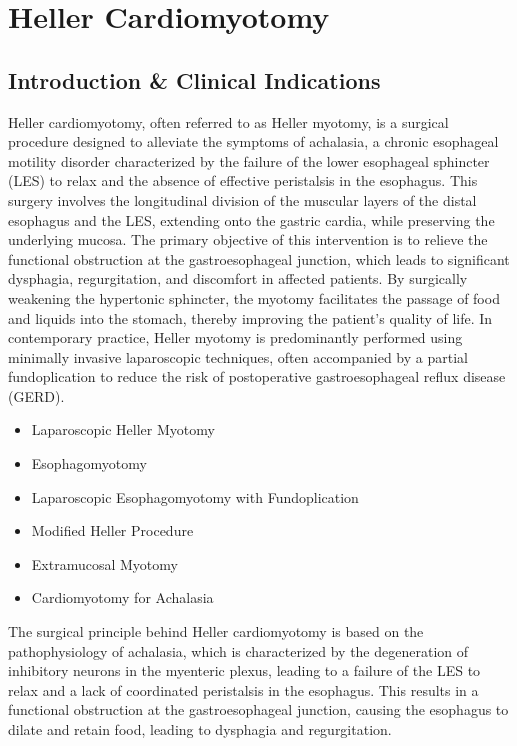\chapter{Heller Cardiomyotomy}

\section*{Introduction \& Clinical Indications}
Heller cardiomyotomy, often referred to as Heller myotomy, is a surgical procedure designed to alleviate the symptoms of achalasia, a chronic esophageal motility disorder characterized by the failure of the lower esophageal sphincter (LES) to relax and the absence of effective peristalsis in the esophagus. This surgery involves the longitudinal division of the muscular layers of the distal esophagus and the LES, extending onto the gastric cardia, while preserving the underlying mucosa. The primary objective of this intervention is to relieve the functional obstruction at the gastroesophageal junction, which leads to significant dysphagia, regurgitation, and discomfort in affected patients. By surgically weakening the hypertonic sphincter, the myotomy facilitates the passage of food and liquids into the stomach, thereby improving the patient's quality of life. In contemporary practice, Heller myotomy is predominantly performed using minimally invasive laparoscopic techniques, often accompanied by a partial fundoplication to reduce the risk of postoperative gastroesophageal reflux disease (GERD).

\begin{itemize}
  \item Laparoscopic Heller Myotomy
  \item Esophagomyotomy
  \item Laparoscopic Esophagomyotomy with Fundoplication
  \item Modified Heller Procedure
  \item Extramucosal Myotomy
  \item Cardiomyotomy for Achalasia
\end{itemize}

The surgical principle behind Heller cardiomyotomy is based on the pathophysiology of achalasia, which is characterized by the degeneration of inhibitory neurons in the myenteric plexus, leading to a failure of the LES to relax and a lack of coordinated peristalsis in the esophagus. This results in a functional obstruction at the gastroesophageal junction, causing the esophagus to dilate and retain food, leading to dysphagia and regurgitation.

